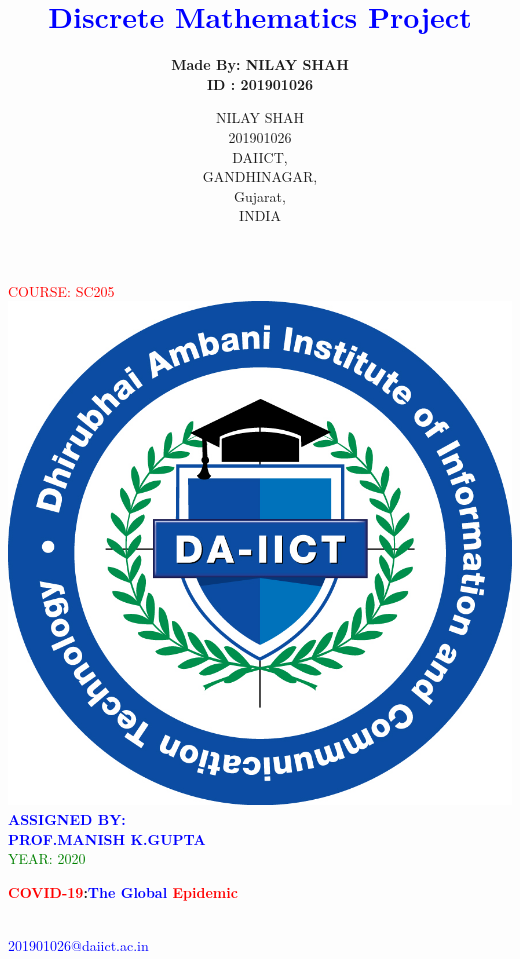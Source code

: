 \documentclass[12pt]{article}
\begin{document}
\title{\textcolor{blue}{\bf{ Discrete Mathematics  Project}}}
 
\author{\bf{ Made By: NILAY SHAH}\\ \bf{    ID :    201901026}} 


\maketitle
\begin{center}
\textcolor {red} {\huge COURSE: SC205} \\
[1.5 cm]
\includegraphics[scale=0.5]{DA-IICT-Emblem-Final Colour.jpg}\\
[1 cm]
\textcolor{blue}{\bf {ASSIGNED BY:} \\ \bf{ PROF.MANISH K.GUPTA}} \\
[2 cm]
\textcolor{green}{\large{YEAR: 2020}}
\end{center}
\newpage
\begin{center}
\huge { \bf{\textcolor{red} {COVID-19}:\textcolor{blue}{The Global} \textcolor{red}{Epidemic}}}
\\
[2 cm]
\bf\small\author{ NILAY SHAH
\\
[2 mm]
201901026
\\
[2 mm]
DAIICT,
\\
[2 mm]
GANDHINAGAR,
\\
[2 mm]
Gujarat,
\\
[2 mm]
INDIA}
\\
[2 mm]
\textcolor{blue}{\small 201901026@daiict.ac.in}
\end{center}
\end{document}
